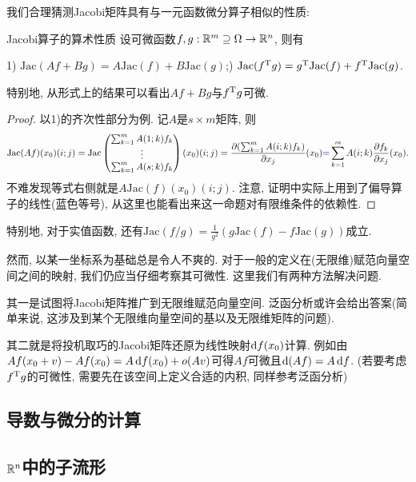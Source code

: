 我们合理猜测Jacobi矩阵具有与一元函数微分算子相似的性质: 

\begin{proposition}{Jacobi算子的算术性质}
	设可微函数$f,g:\mathbb{R} ^m \supseteq \Omega \to \mathbb{R} ^n$, 则有
	\begin{center}
		1) $\mathrm{Jac}(Af+Bg)=A\mathrm{Jac}(f)+B\mathrm{Jac}(g)$;) $\mathrm{Jac}(f^{\operatorname{T}}g) = g^{\operatorname{T}}\mathrm{Jac}(f) + f^{\operatorname{T}}\mathrm{Jac}(g)$. 
	\end{center}
	特别地, 从形式上的结果可以看出$Af+Bg$与$f^{\operatorname{T}}g$可微. 
\end{proposition}
\begin{proof}
	以1)的齐次性部分为例. 记$A$是$s \times m$矩阵, 则$$\mathrm{Jac}(Af)(x_0)(i;j) = \mathrm{Jac}\begin{pmatrix}
		\sum_{k=1}^{m} A(1;k)f_k \\ \vdots \\ \sum_{k=1}^{m} A(s;k)f_k
	\end{pmatrix}(x_0)(i;j) = \frac{\partial (\sum_{k=1}^{m} A(i;k)f_k)}{\partial x_j}(x_0) {\color{blue}=} \sum_{k=1}^{m}A(i;k) \frac{\partial f_k}{\partial x_j}(x_0).$$
	不难发现等式右侧就是$A\mathrm{Jac}(f)(x_0)(i;j)$. 注意, 证明中实际上用到了偏导算子的线性(蓝色等号), 从这里也能看出来这一命题对有限维条件的依赖性. 
\end{proof}

特别地, 对于实值函数, 还有$\mathrm{Jac}(f/g) = \frac{1}{g^2} (g\mathrm{Jac}(f)-f\mathrm{Jac}(g))$成立. 

然而, 以某一坐标系为基础总是令人不爽的. 对于一般的定义在(无限维)赋范向量空间之间的映射, 我们仍应当仔细考察其可微性. 这里我们有两种方法解决问题. 

其一是试图将Jacobi矩阵推广到无限维赋范向量空间. 泛函分析或许会给出答案(简单来说, 这涉及到某个无限维向量空间的基以及无限维矩阵的问题). 

其二就是将投机取巧的Jacobi矩阵还原为线性映射$\mathop{}\!\mathrm{d} f(x_0)$计算. 例如由$Af(x_0+v)-Af(x_0) = A\mathop{}\!\mathrm{d} f(x_0) + o(Av)$可得$Af$可微且$\mathop{}\!\mathrm{d} (Af) = A\mathop{}\!\mathrm{d} f$. (若要考虑$f^{\operatorname{T}}g$的可微性, 需要先在该空间上定义合适的内积, 同样参考泛函分析)


\subsection{导数与微分的计算}





\subsection{$\mathbb{R} ^n$中的子流形}

